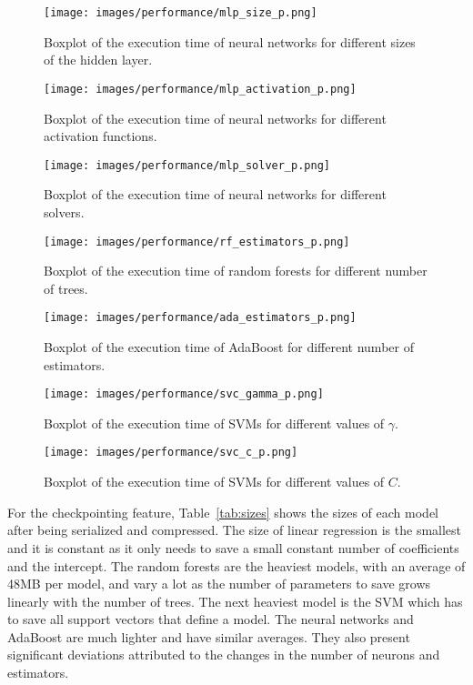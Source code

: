 \begin{figure}
    \centering
    \texttt{[image: images/performance/mlp\_size\_p.png]}
    \caption{\small Boxplot of the execution time of neural networks for different sizes of the hidden layer.}
    \label{fig:nn_neurons_times}
\end{figure}

\begin{figure}
    \centering
    \texttt{[image: images/performance/mlp\_activation\_p.png]}
    \caption{\small Boxplot of the execution time of neural networks for different activation functions.}
    \label{fig:nn_activation_times}
\end{figure}

\begin{figure}
    \centering
    \texttt{[image: images/performance/mlp\_solver\_p.png]}
    \caption{\small Boxplot of the execution time of neural networks for different solvers.}
    \label{fig:nn_solver_times}
\end{figure}

\begin{figure}
    \centering
    \texttt{[image: images/performance/rf\_estimators\_p.png]}
    \caption{\small Boxplot of the execution time of random forests for different number of trees.}
    \label{fig:rf_times}
\end{figure}

\begin{figure}
    \centering
    \texttt{[image: images/performance/ada\_estimators\_p.png]}
    \caption{\small Boxplot of the execution time of AdaBoost for different number of estimators.}
    \label{fig:ada_times}
\end{figure}

\begin{figure}
    \centering
    \texttt{[image: images/performance/svc\_gamma\_p.png]}
    \caption{\small Boxplot of the execution time of SVMs for different values of $\gamma$.}
    \label{fig:svc_c_times}
\end{figure}

\begin{figure}
    \centering
    \texttt{[image: images/performance/svc\_c\_p.png]}
    \caption{\small Boxplot of the execution time of SVMs for different values of $C$.}
    \label{fig:svc_gamma_times}
\end{figure}

For the checkpointing feature, Table~\ref{tab:sizes} shows the sizes of each model after being serialized and compressed. The size of linear regression is the smallest and it is constant as it only needs to save a small constant number of coefficients and the intercept. The random forests are the heaviest models, with an average of 48MB per model, and vary a lot as the number of parameters to save grows linearly with the number of trees. The next heaviest model is the SVM which has to save all support vectors that define a model. The neural networks and AdaBoost are much lighter and have similar averages. They also present significant deviations attributed to the changes in the number of neurons and estimators. 

